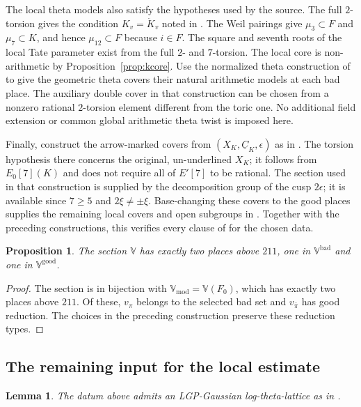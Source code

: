 \documentclass[11pt]{article}
\theoremstyle{plain}
\newtheorem{proposition}[theorem]{Proposition}
\newtheorem{lemma}[theorem]{Lemma}
\theoremstyle{definition}
\newcommand{\Vmod}{\mathbb{V}_{\mathrm{mod}}}
\newcommand{\Vbad}{\mathbb{V}^{\mathrm{bad}}}
\newcommand{\Vgood}{\mathbb{V}^{\mathrm{good}}}
\newcommand{\VV}{\mathbb{V}}
\begin{document}
The local theta models also satisfy the hypotheses used by the source.
The full $2$-torsion gives the condition $K_v=\ddot K_v$ noted in
\cite[Definition 3.1(e)]{IUT1}.
The Weil pairings give $\mu_3\subset F$ and $\mu_7\subset K$, and hence
$\mu_{12}\subset F$ because $i\in F$.
The square and seventh roots of the local Tate parameter exist from the
full $2$- and $7$-torsion.
The local core is non-arithmetic by Proposition~\ref{prop:kcore}.
Use the normalized theta construction of
\cite[Theorem 1.10(iii), Definition 2.5(i)]{EtTh} to give the geometric
theta covers their natural arithmetic models at each bad place.
The auxiliary double cover in that construction can be chosen from a
nonzero rational $2$-torsion element different from the toric one.
No additional field extension or common global arithmetic theta twist
is imposed here.

Finally, construct the arrow-marked covers from $(X_K,\underline C_K,\epsilon)$
as in \cite[Section 1, Definition 1.1, Remark 1.1.2]{IUT1}.
The torsion hypothesis there concerns the original, un-underlined $X_K$;
it follows from $E_0[7](K)$ and does not require all of $E'[7]$ to be rational.
The section used in that construction is supplied by the decomposition group
of the cusp $2\epsilon$; it is available since $7\ge5$ and
$2\xi\ne\pm\xi$.
Base-changing these covers to the good places supplies the remaining local
covers and open subgroups in \cite[Definition 3.1(f)]{IUT1}.
Together with the preceding constructions, this verifies every clause of
\cite[Definition 3.1]{IUT1} for the chosen data.

\begin{proposition}\label{prop:mixed}
The section $\VV$ has exactly two places above $211$, one in $\Vbad$ and
one in $\Vgood$.
\end{proposition}

\begin{proof}
The section is in bijection with $\Vmod=\VV(F_0)$, which has exactly two
places above $211$. Of these, $v_\pi$ belongs to the selected bad set and
$v_{\bar\pi}$ has good reduction. The choices in the preceding construction
preserve these reduction types.
\end{proof}

\subsection{The remaining input for the local estimate}
\label{sec:lattice}

\begin{lemma}\label{lem:theater-existence}
The datum above admits an LGP-Gaussian log-theta-lattice as in
\cite[Definition 3.8(iii)]{IUT3}.
\end{lemma}
\end{document}
